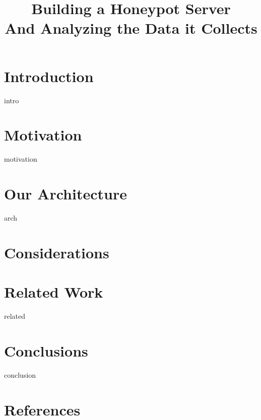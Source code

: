 \documentclass{sig-alternate}
\newcommand{\ignore}[1]{}
\begin{document}
\title{ Building a Honeypot Server \\And Analyzing the Data it Collects}



\maketitle

\begin{abstract}
 
\end{abstract}

\section{Introduction}
\label{sec:intro}
 {intro}

\section{Motivation}
\label{sec:motivation}
 {motivation}

\ignore{Sometimes background is merged into motivation, and is not required separately.}

\section{Our Architecture}
\label{sec:arch}
 {arch}

\section{Considerations}
\label{sec:considerations}


\section{Related Work}
\label{sec:related}
 {related}

\section{Conclusions}
\label{sec:conclusion}
 {conclusion}

\section{References}
\end{document}
